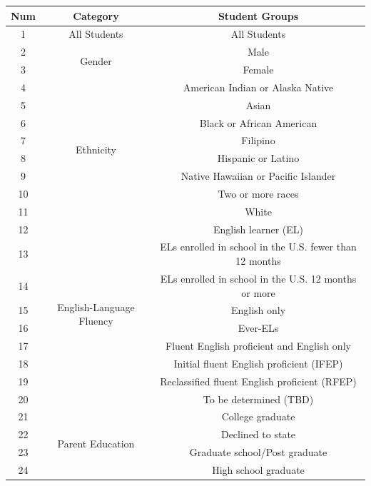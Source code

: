 \documentclass[11pt]{article}
\begin{document}
\begin{table}[h!]
\footnotesize
\centering
\begin{tabular}{||c|c|c||}
  \hline
Num & Category & Student Groups\\
\hline
1 & All Students & All Students \\
\hline
2 &	\multirow{2}{*}{Gender} & Male\\ \cline{1-1}\cline{3-3}
3 &	& Female\\
\hline
4 & \multirow{8}{*}{Ethnicity} & American Indian or Alaska Native\\\cline{1-1}\cline{3-3}
5 && Asian\\\cline{1-1}\cline{3-3}
6 && Black or African American\\\cline{1-1}\cline{3-3}
7 && Filipino\\\cline{1-1}\cline{3-3}
8 && Hispanic or Latino\\\cline{1-1}\cline{3-3}
9 && Native Hawaiian or Pacific Islander\\\cline{1-1}\cline{3-3}
10 && Two or more races\\\cline{1-1}\cline{3-3}
11 && White\\
\hline
12 & \multirow{9}{*}{English-Language Fluency} & English learner (EL)\\\cline{1-1}\cline{3-3}
13 &&  ELs enrolled in school in the U.S. fewer than 12 months\\\cline{1-1}\cline{3-3}
14 && ELs enrolled in school in the U.S. 12 months or more\\\cline{1-1}\cline{3-3}
15 && English only\\\cline{1-1}\cline{3-3}
16 && Ever-ELs\\\cline{1-1}\cline{3-3}
17 && Fluent English proficient and English only\\\cline{1-1}\cline{3-3}
18 && Initial fluent English proficient (IFEP)\\\cline{1-1}\cline{3-3}
19 && Reclassified fluent English proficient (RFEP)\\\cline{1-1}\cline{3-3}
20 && To be determined (TBD)\\
\hline
21 & \multirow{6}{*}{Parent Education} & College graduate\\\cline{1-1}\cline{3-3}
22 && Declined to state\\\cline{1-1}\cline{3-3}
23 && Graduate school/Post graduate\\\cline{1-1}\cline{3-3}
24 && High school graduate\\\cline{1-1}\cline{3-3}

\end{tabular}
\end{table}
\end{document}
